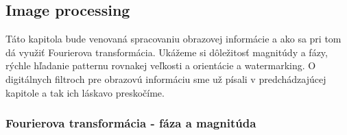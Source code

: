 \subsection{Image processing}

Táto kapitola bude venovaná spracovaniu obrazovej informácie a ako sa
pri tom dá využiť Fourierova transformácia. Ukážeme si dôležitosť
magnitúdy a fázy, rýchle hľadanie patternu rovnakej
veľkosti a orientácie a watermarking. O digitálnych filtroch pre
obrazovú informáciu sme už písali v predchádzajúcej kapitole a tak ich
láskavo preskočíme.

\subsubsection{Fourierova transformácia - fáza a magnitúda}


